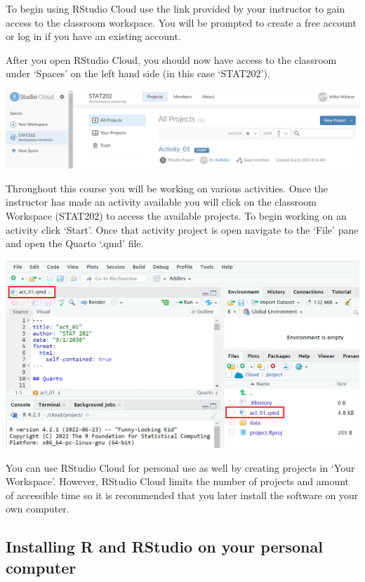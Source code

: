 \documentclass[
  letterpaper,
  DIV=11,
  numbers=noendperiod]{scrreprt}
\theoremstyle{definition}
\theoremstyle{remark}
\begin{document}
To begin using RStudio Cloud use the link provided by your instructor to
gain access to the classroom workspace. You will be prompted to create a
free account or log in if you have an existing account.

After you open RStudio Cloud, you should now have access to the
classroom under `Spaces' on the left hand side (in this case `STAT202').

\includegraphics{images/rstudio_cloud.png}

Throughout this course you will be working on various activities. Once
the instructor has made an activity available you will click on the
classroom Workspace (STAT202) to access the available projects. To begin
working on an activity click `Start'. Once that activity project is open
navigate to the `File' pane and open the Quarto `.qmd' file.

\includegraphics{images/rstudio_workspace.png}

You can use RStudio Cloud for personal use as well by creating projects
in `Your Workspace'. However, RStudio Cloud limits the number of
projects and amount of accessible time so it is recommended that you
later install the software on your own computer.

\hypertarget{installing-r-and-rstudio-on-your-personal-computer}{%
\subsection{Installing R and RStudio on your personal
computer}\label{installing-r-and-rstudio-on-your-personal-computer}}
\end{document}
